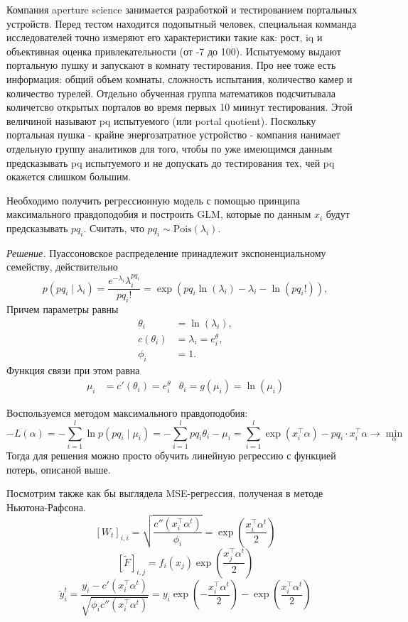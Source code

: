 Компания aperture science занимается разработкой и тестированием портальных устройств. Перед тестом находится подопытный человек, специальная комманда исследователей точно измеряют его характеристики такие как: рост, iq и объективная оценка привлекательности (от -7 до 100). Испытуемому выдают портальную пушку и запускают в комнату тестирования. Про нее тоже есть информация: общий объем комнаты, сложность испытания, количество камер и количество турелей. Отдельно обученная группа математиков подсчитывала количетсво открытых порталов во время первых 10 миинут тестирования. Этой величиной называют pq испытуемого (или portal quotient). Поскольку портальная пушка - крайне энергозатратное устройство - компания нанимает отдельную группу аналитиков для того, чтобы по уже имеющимся данным предсказывать pq испытуемого и не допускать до тестирования тех, чей pq окажется слишком большим.

Необходимо получить регрессионную модель с помощью принципа максимального правдоподобия и построить GLM, которые по данным $x_i$ будут предсказывать $pq_i$. Считать, что $pq_i \sim \text{Pois}(\lambda_i)$.

\noindent\textit{Решение.}
Пуассоновское распределение принадлежит экспоненциальному семейству, действительно
$$
  p(pq_i \mid \lambda_i) = \frac{e^{-\lambda_i}\lambda_i^{pq_i}}{pq_i!} = \exp\left(
  pq_i\ln(\lambda_i) - \lambda_i - \ln(pq_i!)
  \right),
$$
Причем параметры равны
\begin{align*}
  \theta_i    & = \ln(\lambda_i),         \\
  c(\theta_i) & = \lambda_i = e^\theta_i, \\
  \phi_i      & = 1.
\end{align*}
Функция связи при этом равна
\begin{align*}
  \mu_i & = c'(\theta_i) = e^\theta_i & 
  \theta_i = g(\mu_i) = \ln(\mu_i)
\end{align*}

Воспользуемся методом максимального правдоподобия:
$$
  -L(\alpha) = -\sum_{i=1}^l \ln p(pq_i \mid \mu_i) = -\sum_{i=1}^l pq_i \theta_i - \mu_i =
  \sum_{i=1}^l \exp\left(x_i^\top \alpha\right) - pq_i \cdot x_i^\top \alpha \to \min_\alpha
$$
Тогда для решения можно просто обучить линейную регрессию с функцией потерь, описаной выше.

Посмотрим также как бы выглядела MSE-регрессия, полученая в методе Ньютона-Рафсона.
$$
  [W_t]_{i,i} = \sqrt{\frac{c''(x_i^\top\alpha^t)}{\phi_i}} = \exp\left(\frac{x_i^\top\alpha^t}{2}\right)
$$
$$
  [\widetilde{F}]_{i,j} = f_i(x_j)\exp\left(\frac{x_j^\top\alpha^t}{2}\right)
$$
$$
  \widetilde{y}^t_i = \frac{y_i - c'(x_i^\top\alpha^t)}{\sqrt{\phi_i c''(x_i^\top\alpha^t)}} = 
  y_i\exp\left(-\frac{x_i^\top\alpha^t}{2}\right) - \exp\left(\frac{x_i^\top\alpha^t}{2}\right)
$$

